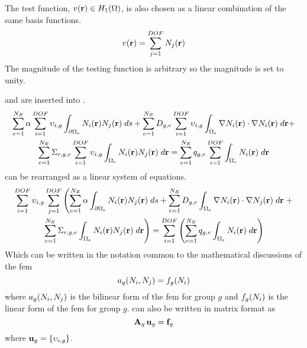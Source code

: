     The test function, $v(\mathbf{r}) \in H_1(\Omega)$, is also chosen as a linear 
    combination of the same basis functions.
    \begin{equation} 
      \label{eq:linear_superposition}
      v(\mathbf{r}) = \sum_{j=1}^{DOF} N_j(\mathbf{r})
    \end{equation}
    The magnitude of the testing function is arbitrary so the magnitude is set
    to unity.
    
     and  are inserted 
    into .
    \begin{multline}
      \label{eq:this_above}
      \sum_{e=1}^{N_E} \alpha \sum_{i=1}^{DOF} \upsilon_{i,g}
        \int_{\partial \Omega_e}
        N_i(\mathbf{r})  N_j(\mathbf{r}) \;ds +
        \sum_{e=1}^{N_E} D_{g,e} \sum_{i=1}^{DOF} \upsilon_{i,g}
        \int_{\Omega_e} \mathbf{\nabla} N_i(\mathbf{r}) \cdot \mathbf{\nabla} N_i(\mathbf{r})\;d\mathbf{r}
        + \\
        \sum_{e=1}^{N_E} \Sigma_{r,g,e} \sum_{i=1}^{DOF} \upsilon_{i,g}
        \int_{\Omega_e} N_i(\mathbf{r}) N_j(\mathbf{r}) \; d\mathbf{r} =
        \sum_{e=1}^{N_E} q_{g,e} \sum_{i=1}^{DOF} 
        \int_{\Omega_e} N_i(\mathbf{r}) \; d\mathbf{r}
    \end{multline}
     can be rearranged as a linear system of equations.
    \begin{multline}
      \label{eq:linear_equation}
      \sum_{i=1}^{DOF} \upsilon_{i,g} \sum_{j=1}^{DOF} \left(
        \sum_{e=1}^{N_E} \alpha \int_{\partial \Omega_e}
        N_i(\mathbf{r})  N_j(\mathbf{r}) \;ds +
        \sum_{e=1}^{N_E} D_{g,e} 
        \int_{\Omega_e} \mathbf{\nabla} N_i(\mathbf{r}) \cdot \mathbf{\nabla} N_j(\mathbf{r})\;d\mathbf{r}
        \right.
        + \\
        \left.
        \sum_{e=1}^{N_E} \Sigma_{r,g,e}
        \int_{\Omega_e} N_i(\mathbf{r}) N_j(\mathbf{r}) \; d\mathbf{r} \right) =
        \sum_{i=1}^{DOF} \left(
        \sum_{e=1}^{N_E} q_{g,e} 
        \int_{\Omega_e} N_i(\mathbf{r}) \; d\mathbf{r} \right)
    \end{multline}
    Which can be written in the notation common to the mathematical discussions 
    of the \gls{fem}
    \begin{equation}
      \label{eq:fem_notation}
      a_g(N_i,N_j) = f_g(N_i)
    \end{equation}
    where $a_g(N_i,N_j)$ is the bilinear form of the \gls{fem} for 
    group $g$ and $f_g(N_i)$ is the linear form of the \gls{fem} for group
    $g$.
     can also be written in matrix format as
    \begin{equation}
      \label{eq:matrix_notation}
      \mathbf{A}_g \, \mathbf{u}_g = \mathbf{f}_g
    \end{equation}
    where $\mathbf{u}_g = \{\upsilon_{i,g}\}$. 
    
